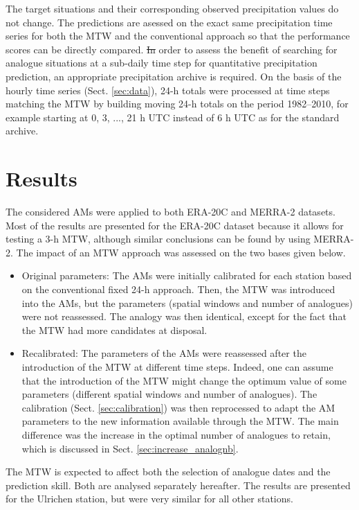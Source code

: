 \documentclass[hess, manuscript]{copernicus}
\providecommand{\DIFadd}[1]{{\protect\color{blue}\uwave{#1}}} %
\providecommand{\DIFdel}[1]{{\protect\color{red}\sout{#1}}}                      %
\providecommand{\DIFaddbegin}{} %
\providecommand{\DIFaddend}{} %
\providecommand{\DIFdelbegin}{} %
\providecommand{\DIFdelend}{} %
\begin{document}
	The target situations and their corresponding observed precipitation values do not change. The predictions are asessed on the exact same precipitation time series for both the MTW and the conventional approach so that the performance scores can be directly compared. \DIFdelbegin \DIFdel{In }\DIFdelend \DIFaddbegin \DIFadd{However, in }\DIFaddend order to assess the benefit of searching for analogue situations at a sub-daily time step for quantitative precipitation prediction, an appropriate precipitation archive is required. On the basis of the hourly time series (Sect. \ref{sec:data}), 24-h totals were processed at time steps matching the MTW by building moving 24-h totals on the period 1982--2010, for example starting at 0, 3, ..., 21 h UTC instead of 6 h UTC as for the standard archive.

	
	\section{Results}
	\label{sec:results}

	The considered AMs were applied to both ERA-20C and MERRA-2 datasets. Most of the results are presented for the ERA-20C dataset because it allows for testing a 3-h MTW, although similar conclusions can be found by using MERRA-2. The impact of an MTW approach was assessed on the two bases given below.
	\begin{itemize}
		\item Original parameters: The AMs were initially calibrated for each station based on the conventional fixed 24-h approach. Then, the MTW was introduced into the AMs, but the parameters (spatial windows and number of analogues) were not reassessed. The analogy was then identical, except for the fact that the MTW had more candidates at disposal.
		\item Recalibrated: The parameters of the AMs were reassessed after the introduction of the MTW at different time steps. Indeed, one can assume that the introduction of the MTW might change the optimum value of some parameters (different spatial windows and number of analogues). The calibration (Sect. \ref{sec:calibration}) was then reprocessed to adapt the AM parameters to the new information available through the MTW. The main difference was the increase in the optimal number of analogues to retain, which is discussed in Sect. \ref{sec:increase_analognb}.
	\end{itemize}

	The MTW is expected to affect both the selection of analogue dates and the prediction skill. Both are analysed separately hereafter. The results are presented for the Ulrichen station, but were very similar for all other stations.
\end{document}
